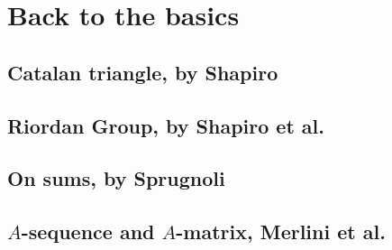 
\chapter{Back to the basics}

\section{Catalan triangle, by Shapiro}


\section{Riordan Group, by Shapiro et al.}
\section{On sums, by Sprugnoli}
\section{$A$-sequence and $A$-matrix, Merlini et al.}
